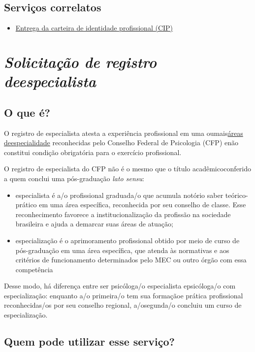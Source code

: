 \section{Serviços correlatos}

\begin{itemize}
  \item  \hyperref[]{Entrega  da carteira de identidade profissional (CIP)}
\end{itemize}

\chapter{\texorpdfstring{\emph{Solicitação de registro deespecialista}}{Solicitação de registro de especialista}}


\section{O que é?}

O registro de especialista atesta a experiência profissional em uma oumais\href{https://site.cfp.org.br/servicos/titulo-de-especialista/}{áreas deespecialidade} reconhecidas pelo Conselho Federal de Psicologia (CFP) enão constitui condição obrigatória para o exercício profissional.

O registro de especialista do CFP não é o mesmo que o título acadêmicoconferido a quem conclui uma pós-graduação \emph{lato sensu}:

\begin{itemize}
  \item  especialista é a/o profissional graduada/o que acumula notório saber  teórico-prático em uma área específica, reconhecida por seu conselho  de classe. Esse reconhecimento favorece a institucionalização da  profissão na sociedade brasileira e ajuda a demarcar suas áreas de  atuação;
  \item  especialização é o aprimoramento profissional obtido por meio de curso  de pós-graduação em uma área específica, que atenda às normativas e  aos critérios de funcionamento determinados pelo MEC ou outro órgão  com essa competência
\end{itemize}

Desse modo, há diferença entre ser psicóloga/o especialista epsicóloga/o com especialização: enquanto a/o primeira/o tem sua formaçãoe prática profissional reconhecidas/os por seu conselho regional, a/osegunda/o concluiu um curso de especialização.

\section{Quem pode utilizar esse serviço?}

